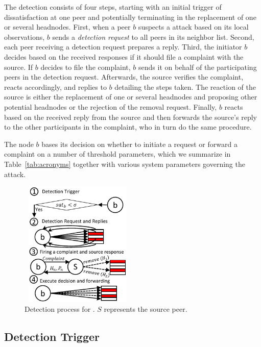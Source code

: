 The detection consists of four steps, starting with an initial trigger of dissatisfaction at one peer and potentially terminating in the replacement of one or several headnodes. 
First, when a peer $b$ suspects a \drop attack based on its local observations, $b$ sends a \emph{detection request} to all peers in its neighbor list.
Second, each peer receiving a detection request prepares a reply. 
Third, the initiator $b$ decides based on the received responses if it should file a complaint with the source.
If $b$ decides to file the complaint, $b$ sends it on behalf of the participating peers in the detection request. 
Afterwards, the source verifies the complaint, reacts accordingly, and replies to $b$ detailing the steps taken. 
The reaction of the source is either the replacement of one or several headnodes and proposing other potential headnodes or the rejection of the removal request.
Finally, $b$ reacts based on the received reply from the source and then forwards the source's reply to the other participants in the complaint, who in turn do the same procedure. 

The node $b$ bases its decision on whether to initiate a request or forward a complaint on a number of threshold parameters, which we summarize in Table~\ref{tab:acronyms} together with various system parameters governing the attack. 




\begin{figure}
 \centering
 \includegraphics[width=5.5cm,height=6cm]{./Figures/detection.pdf}
  \caption{Detection process for \drop. $S$ represents the source peer.}
\label{detection-blocks} 
\end{figure}

\subsection{Detection Trigger}
\label{Detection-Trigger}


